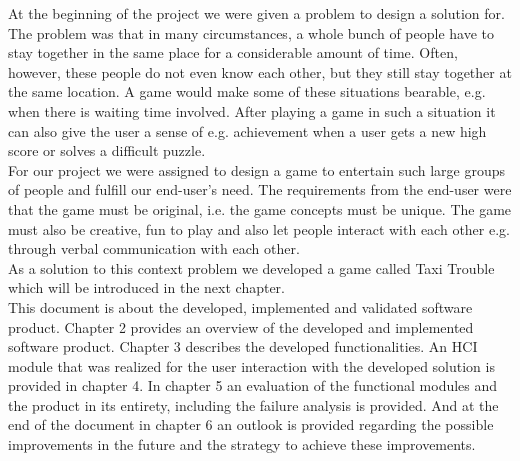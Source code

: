 At the beginning of the project we were given a problem to design a solution for. The problem was that in many
circumstances, a whole bunch of people have to stay together in the same place for a considerable amount of
time. Often, however, these people do not even know each other, but they still stay together at the same location. A game would make some of these situations bearable, e.g. when there is waiting time involved. After playing a game in such a situation it can also give the user a sense of e.g. achievement when a user gets a new high score or solves a difficult puzzle. \\
For our project we were assigned to design a game to entertain such large groups of people and fulfill our end-user's need. The requirements from the end-user were that the game must be original, i.e. the game concepts must be unique. The game must also be creative, fun to play and also let people interact with each other e.g. through verbal communication with each other. \\
As a solution to this context problem we developed a game called Taxi Trouble which will be introduced in the next chapter. \\
\newline
This document is about the developed, implemented and validated software product. Chapter 2 provides an overview of the developed and implemented software product. Chapter 3 describes the developed functionalities. An HCI module that was realized for the user interaction with the developed solution is provided in chapter 4.  In chapter 5 an evaluation of the functional modules and the product in its entirety, including the failure analysis is provided. And at the end of the document in chapter 6 an outlook is provided regarding the possible improvements in the future and the strategy to achieve these improvements.
